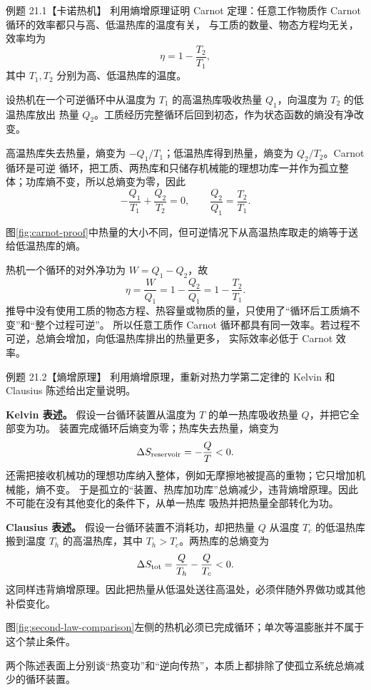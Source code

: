 \begin{origexamplebox}{例题 21.1【卡诺热机】}
利用熵增原理证明 Carnot 定理：任意工作物质作 Carnot 循环的效率都只与高、低温热库的温度有关，
与工质的数量、物态方程均无关，效率均为
\[
  \eta=1-\frac{T_2}{T_1},
\]
其中 $T_1,T_2$ 分别为高、低温热库的温度。
\end{origexamplebox}

\begin{xesolution}
设热机在一个可逆循环中从温度为 $T_1$ 的高温热库吸收热量 $Q_1$，向温度为 $T_2$ 的低温热库放出
热量 $Q_2$。工质经历完整循环后回到初态，作为状态函数的熵没有净改变。

高温热库失去热量，熵变为 $-Q_1/T_1$；低温热库得到热量，熵变为 $Q_2/T_2$。Carnot 循环是可逆
循环，把工质、两热库和只储存机械能的理想功库一并作为孤立整体；功库熵不变，所以总熵变为零，因此
\[
  -\frac{Q_1}{T_1}+\frac{Q_2}{T_2}=0,
  \qquad
  \frac{Q_2}{Q_1}=\frac{T_2}{T_1}.
\]

\carnotProofDiagram
{}\label{fig:carnot-proof}
图\ref{fig:carnot-proof}中热量的大小不同，但可逆情况下从高温热库取走的熵等于送给低温热库的熵。

热机一个循环的对外净功为 $W=Q_1-Q_2$，故
\[
  \boxed{\eta=\frac{W}{Q_1}
  =1-\frac{Q_2}{Q_1}
  =1-\frac{T_2}{T_1}}.
\]
推导中没有使用工质的物态方程、热容量或物质的量，只使用了“循环后工质熵不变”和“整个过程可逆”。
所以任意工质作 Carnot 循环都具有同一效率。若过程不可逆，总熵会增加，向低温热库排出的热量更多，
实际效率必低于 Carnot 效率。
\end{xesolution}

\begin{origexamplebox}{例题 21.2【熵增原理】}
利用熵增原理，重新对热力学第二定律的 Kelvin 和 Clausius 陈述给出定量说明。
\end{origexamplebox}

\begin{xesolution}
\textbf{Kelvin 表述。} 假设一台循环装置从温度为 $T$ 的单一热库吸收热量 $Q$，并把它全部变为功。
装置完成循环后熵变为零；热库失去热量，熵变为
\[
  \Delta S_{\rm reservoir}=-\frac{Q}{T}<0.
\]
还需把接收机械功的理想功库纳入整体，例如无摩擦地被提高的重物；它只增加机械能，熵不变。
于是孤立的“装置、热库加功库”总熵减少，违背熵增原理。因此不可能在没有其他变化的条件下，从单一热库
吸热并把热量全部转化为功。

\textbf{Clausius 表述。} 假设一台循环装置不消耗功，却把热量 $Q$ 从温度 $T_c$ 的低温热库搬到温度
$T_h$ 的高温热库，其中 $T_h>T_c$。两热库的总熵变为
\[
  \Delta S_{\rm tot}
  =\frac{Q}{T_h}-\frac{Q}{T_c}<0.
\]
这同样违背熵增原理。因此把热量从低温处送往高温处，必须伴随外界做功或其他补偿变化。

\secondLawEntropyDiagram
{}\label{fig:second-law-comparison}
图\ref{fig:second-law-comparison}左侧的热机必须已完成循环；单次等温膨胀并不属于这个禁止条件。

两个陈述表面上分别谈“热变功”和“逆向传热”，本质上都排除了使孤立系统总熵减少的循环装置。
\end{xesolution}

